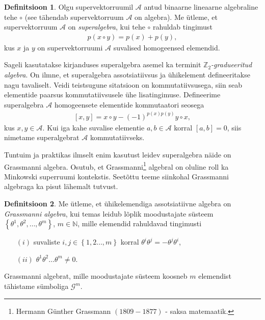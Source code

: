 \documentclass[12pt]{article}
\theoremstyle{plain}
\theoremstyle{definition}
\newtheorem{definitsioon}{Definitsioon}[section]
\numberwithin{equation}{section}
\def\N{{\mathbb N}}
\def\Z{{\mathbb Z}}
\def\A{{\mathcal A}}
\def\G{{\mathcal G}}
\begin{document}
\begin{definitsioon}
Olgu supervektorruumil $\A$ antud binaarne lineaarne algebraline 
tehe $\circ$ (see tähendab supervektorruum $\A$ on algebra). Me 
ütleme, et supervektorruum $\A$ on \emph{superalgebra}, kui tehe 
$\circ$ rahuldab tingimust
\begin{align*}
p\left(x \circ y\right) = p\left(x\right) + p\left(y\right),
\end{align*}
kus $x$ ja $y$ on supervektorruumi $\A$ suvalised homogeensed 
elemendid.
\end{definitsioon}

Sageli kasutatakse kirjanduses superalgebra asemel ka terminit 
\emph{$\Z_2$-gradueeritud algebra}. On ilmne, et superalgebra
assotsiatiivsus ja ühikelement defineeritakse nagu tavaliselt. 
Veidi teistsugune sitatsioon on kommutatiivsusega, siin seab 
elementide paarsus kommutatiivsusele ühe lisatingimuse. Defineerime 
superalgebra $\A$ homogeensete elementide kommutaatori seosega
\begin{align*}
\left[x, y\right] = x \circ y - 
\left(-1\right)^{p\left(x\right) p\left(y\right)} y \circ x,
\end{align*}
kus $x, y \in \A$. Kui iga kahe suvalise elementie $a, b \in \A$ 
korral $\left[a, b\right] = 0$, siis nimetame superalgebrat $\A$ 
kommutatiivseks.

Tuntuim ja praktikas ilmselt enim kasutust leidev superalgebra näide 
on Grassmanni algebra. Osutub, et 
Grassmanni\footnote{Hermann Günther Grassmann $(1809 - 1877)$ - 
saksa matemaatik.} algebral on oluline roll ka Minkowski 
superruumi kontekstis. Seetõttu teeme siinkohal Grassmanni 
algebraga ka pisut lähemalt tutvust.

\begin{definitsioon} \label{def:grassmann}
Me ütleme, et ühikelemendiga assotsiatiivne algebra on 
\emph{Grassmanni algebra}, kui temas leidub lõplik moodustajate 
süsteem $\left\lbrace\theta^1, \theta^2, \ldots, 
\theta^m\right\rbrace$, $m \in \N$, mille elemendid rahuldavad 
tingimusti \begin{itemize}
\item[$(i)$] suvaliste $i, j \in \left\lbrace 1, 2 \ldots, 
m \right\rbrace$ korral $\theta^i \theta^j = - \theta^j \theta^i$,
\item[$(ii)$] $\theta^1 \theta^2 \ldots \theta^m \neq 0$.
\end{itemize}
Grassmanni algebrat, mille moodustajate süsteem koosneb $m$ 
elemendist tähistame sümboliga $\G^m$.
\end{definitsioon}
\end{document}
